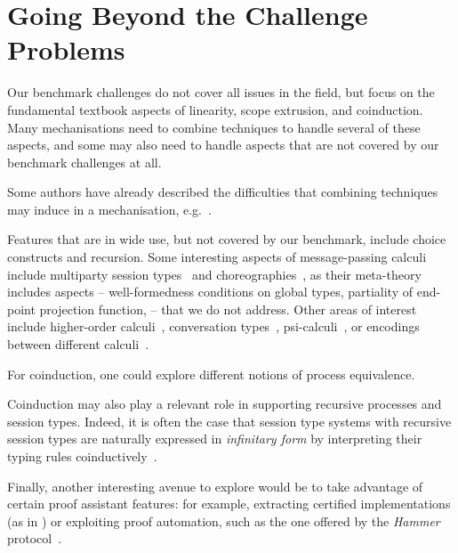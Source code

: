 \documentclass[runningheads]{llncs}
\begin{document}

\section{Going Beyond the Challenge Problems}\label{sec:going-beyond}
Our benchmark challenges do not cover all issues in the field, but focus on the fundamental textbook aspects of linearity, scope extrusion, and coinduction.
Many mechanisations need to combine techniques to handle several of these aspects, and some may also need to handle aspects that are not covered by our benchmark challenges at all.

Some authors have already described the difficulties that combining techniques may induce in a mechanisation, e.g.~\cite{DBLP:conf/forte/ZalakainD21}.

Features that are in wide use, but not covered by our benchmark, include choice constructs and recursion.
Some interesting aspects of message-passing calculi include multiparty session types~\cite{10.1145/2827695} and choreographies~\cite{Carbone2013}, as their meta-theory includes aspects -- \eg well-formedness conditions on global types, partiality of end-point projection function, \etc -- that we do not address.
Other areas of interest include higher-order calculi~\cite{Hirsch2022}, conversation types~\cite{DBLP:journals/tcs/CairesV10}, psi-calculi~\cite{lmcs:696}, or encodings between different calculi~\cite{DBLP:journals/iandc/Gorla10,DBLP:journals/iandc/DardhaGS17}.

For coinduction, one could explore different notions of process equivalence.

Coinduction may also play a relevant role in supporting recursive processes and session types.
Indeed, it is often the case that session type systems with recursive session types are naturally expressed in \emph{infinitary form} by interpreting their typing rules
coinductively~\cite{DerakhshanPfenning22,HornePadovani23}.

Finally, another interesting avenue to explore would be to take
advantage of certain proof assistant features: for example, extracting
certified implementations (as in \cite{Castro-Perez2021}) or exploiting
proof automation, such as the one offered by the \emph{Hammer}
protocol~\cite{BohmeN10,CzajkaK18}.
\end{document}
